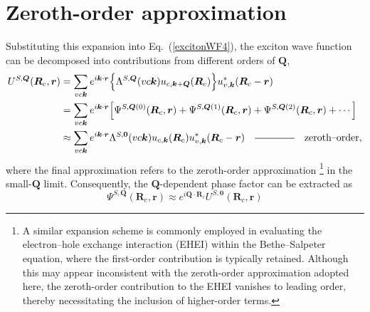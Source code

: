 \section{Zeroth-order approximation}

Substituting this expansion into Eq.~(\ref{excitonWF4}), the exciton wave function can be decomposed into contributions from different orders of $\boldsymbol{Q}$,
\begin{equation}
\begin{aligned}
U^{S,\boldsymbol{Q}} (\boldsymbol{R}_c,\boldsymbol{r})
&=
\sum_{vc\boldsymbol{k}}
e^{i\boldsymbol{k}\cdot\boldsymbol{r}}
\Big\{
\Lambda^{S,\boldsymbol{Q}}(vc\boldsymbol{k})
u_{c,\boldsymbol{k}+\boldsymbol{Q}}(\boldsymbol{R}_c)
\Big\}
u^{*}_{v,\boldsymbol{k}}
(\boldsymbol{R}_c-\boldsymbol{r})
\\
&=
\sum_{vc\boldsymbol{k}}
e^{i\boldsymbol{k}\cdot\boldsymbol{r}}
\Big[
\Psi^{S,\boldsymbol{Q}(0)}
(\boldsymbol{R}_c,\boldsymbol{r})
+
\Psi^{S,\boldsymbol{Q}(1)}
(\boldsymbol{R}_c,\boldsymbol{r})
+
\Psi^{S,\boldsymbol{Q}(2)}
(\boldsymbol{R}_c,\boldsymbol{r})
+\cdots
\Big]
\\
&\approx
\sum_{vc\boldsymbol{k}}
e^{i\boldsymbol{k}\cdot\boldsymbol{r}}
\Lambda^{S,\boldsymbol{0}}(vc\boldsymbol{k})
u_{c,\boldsymbol{k}}(\boldsymbol{R}_c)
u^{*}_{v,\boldsymbol{k}}
(\boldsymbol{R}_c-\boldsymbol{r}) \quad \rule[0.5ex]{40pt}{0.5pt} \quad \text{zeroth--order},
\end{aligned}
\label{excitonWF_expanded}
\end{equation}
where the final approximation refers to the zeroth-order approximation \footnote{A similar expansion scheme is commonly employed in evaluating the electron--hole exchange interaction (EHEI) within the Bethe--Salpeter equation, where the first-order contribution is typically retained. Although this may appear inconsistent with the zeroth-order approximation adopted here, the zeroth-order contribution to the EHEI vanishes to leading order, thereby necessitating the inclusion of higher-order terms.} in the small-$\boldsymbol{Q}$ limit. Consequently, the $\boldsymbol{Q}$-dependent phase factor can be extracted as~\cite{qiu2015nonanalyticity}
\begin{equation}
\Psi^{S,\boldsymbol{Q}}(\boldsymbol{R}_c,\boldsymbol{r})
\approx
e^{i\boldsymbol{Q}\cdot\boldsymbol{R}_c}
U^{S,\boldsymbol{0}} (\boldsymbol{R}_c,\boldsymbol{r})
\label{relation}
\end{equation}

